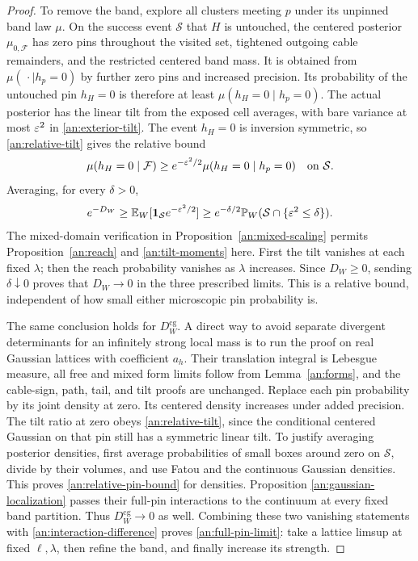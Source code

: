 \begin{proof}
To remove the band, explore all clusters meeting
$p$ under its unpinned band law $\mu$.  On the
success event $\mathcal S$ that $H$ is untouched,
the centered posterior $\mu_{0,\mathcal F}$
has zero pins throughout the visited set,
tightened outgoing cable remainders, and the
restricted centered band mass.  It is obtained
from $\mu(\,\cdot\mid h_p=0)$ by further
zero pins and increased precision.  Its
probability of the untouched pin $h_H=0$
is therefore at least
$\mu(h_H=0\mid h_p=0)$.  The actual posterior
has the linear tilt from the exposed cell
averages, with bare variance at most $\varepsilon^2$
in \eqref{an:exterior-tilt}.  The event
$h_H=0$ is inversion symmetric, so
\eqref{an:relative-tilt} gives the relative
bound
\[
 \mu(h_H=0\mid\mathcal F)
 \ge e^{-\varepsilon^2/2}\mu(h_H=0\mid h_p=0)
 \quad\text{on }\mathcal S.
\]
Averaging, for every $\delta>0$,
\begin{equation}
 e^{-D_W}
 \ge\mathbb E_W[\mathbf 1_{\mathcal S}e^{-\varepsilon^2/2}]
 \ge e^{-\delta/2}
       \mathbb P_W(\mathcal S\cap\{\varepsilon^2\le\delta\}).
 \label{an:relative-pin-bound}
\end{equation}
The mixed-domain verification in
Proposition~\ref{an:mixed-scaling} permits
Proposition~\ref{an:reach} and
\eqref{an:tilt-moments} here.  First the tilt
vanishes at each fixed $\lambda$; then the
reach probability vanishes as $\lambda$
increases.  Since $D_W\ge0$, sending
$\delta\downarrow0$ proves that $D_W\to0$
in the three prescribed limits.  This is
a relative bound, independent of how small
either microscopic pin probability is.

The same conclusion holds for
$D_W^{\mathrm{cg}}$.  A direct way to
avoid separate divergent determinants for
an infinitely strong local mass is to run
the proof on real Gaussian lattices with
coefficient $a_h$.  Their translation
integral is Lebesgue measure, all
free and mixed form limits follow from
Lemma~\ref{an:forms}, and the cable-sign,
path, tail, and tilt proofs are unchanged.
Replace each pin probability by its
joint density at zero.  Its centered
density increases under added precision.
The tilt ratio at zero obeys
\eqref{an:relative-tilt}, since the
conditional centered Gaussian on that
pin still has a symmetric linear tilt.
To justify averaging posterior densities,
first average probabilities of small
boxes around zero on $\mathcal S$,
divide by their volumes, and use Fatou
and the continuous Gaussian densities.
This proves \eqref{an:relative-pin-bound}
for densities.  Proposition
\ref{an:gaussian-localization} passes
their full-pin interactions to the
continuum at every fixed band
partition.  Thus
$D_W^{\mathrm{cg}}\to0$ as well.
Combining these two vanishing statements
with \eqref{an:interaction-difference}
proves \eqref{an:full-pin-limit}:
take a lattice limsup at fixed
$\ell,\lambda$, then refine the band,
and finally increase its strength.
\end{proof}


